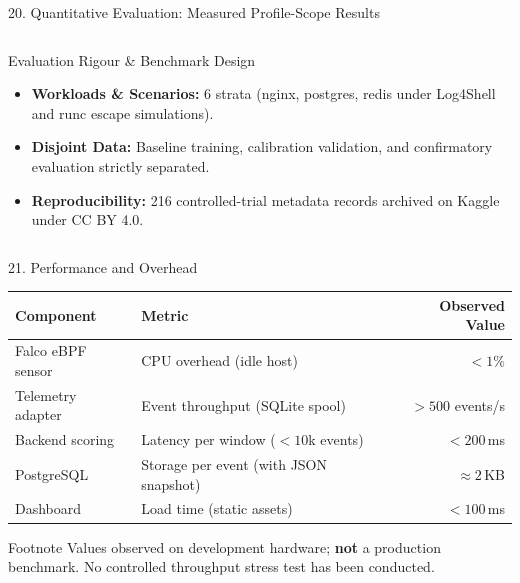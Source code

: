 \documentclass[aspectratio=169,10pt]{beamer}
\begin{document}
\begin{frame}{20. Quantitative Evaluation: Measured Profile-Scope Results}
\begin{columns}[T,onlytextwidth]
\begin{block}{Evaluation Rigour \& Benchmark Design}
\scriptsize
\begin{itemize}\setlength{\itemsep}{2pt}
  \item \textbf{Workloads \& Scenarios:} 6 strata (nginx, postgres, redis under Log4Shell and runc escape simulations).
  \item \textbf{Disjoint Data:} Baseline training, calibration validation, and confirmatory evaluation strictly separated.
  \item \textbf{Reproducibility:} 216 controlled-trial metadata records archived on Kaggle under CC BY 4.0.
\end{itemize}
\end{block}
\end{columns}
\end{frame}

\begin{frame}{21. Performance and Overhead}
\small

\begin{table}\centering
\renewcommand{\arraystretch}{1.4}
\begin{tabularx}{0.96\textwidth}{l X r}
\toprule
\textbf{Component} & \textbf{Metric} & \textbf{Observed Value} \\\midrule
Falco eBPF sensor       & CPU overhead (idle host)         & $<1\%$ \\
Telemetry adapter       & Event throughput (SQLite spool)   & $>500$ events/s \\
Backend scoring         & Latency per window ($<10$k events) & $<200$\,ms \\
PostgreSQL              & Storage per event (with JSON snapshot) & $\approx2$\,KB \\
Dashboard               & Load time (static assets)         & $<100$\,ms \\
\bottomrule
\end{tabularx}
\end{table}

\vspace{0.2cm}
\begin{alertblock}{Footnote}
Values observed on development hardware; \textbf{not} a production benchmark. No controlled throughput stress test has been conducted.
\end{alertblock}
\end{frame}
\end{document}
